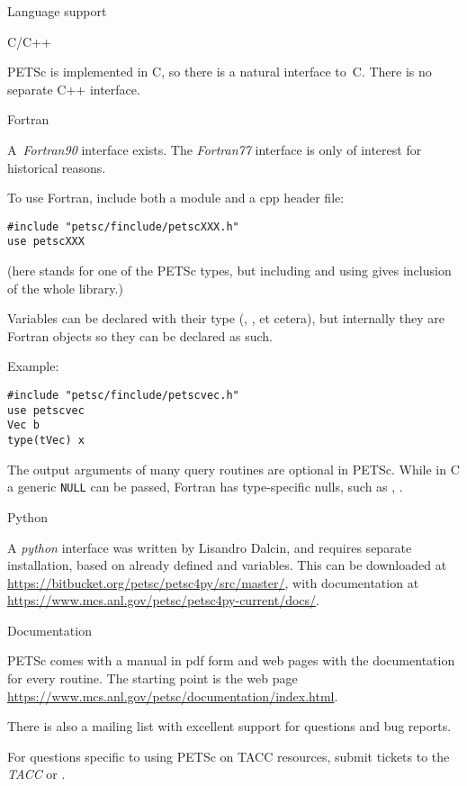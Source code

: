  {Language support}

 {C/C++}

PETSc is implemented in C, so there is a natural interface
to~C. There is no separate C++ interface.

 {Fortran}

A~\emph{Fortran90}
interface exists. The \emph{Fortran77}
interface is only of
interest for historical reasons.

To use Fortran, include both a module and a cpp header file:
\begin{verbatim}
#include "petsc/finclude/petscXXX.h"
use petscXXX
\end{verbatim}
(here  stands for one of the PETSc types, but including
 and using 
gives inclusion of the whole library.)

Variables can be declared with their type (,
,  et cetera), but internally they are
Fortran  objects so they can be declared as such.

Example:
\begin{lstlisting}
#include "petsc/finclude/petscvec.h"
use petscvec
Vec b
type(tVec) x
\end{lstlisting}

The output arguments of many query routines are optional in PETSc.
While in C a generic \lstinline{NULL} can be passed,
Fortran has type-specific nulls, such as
, .

 {Python}

A \emph{python} interface was written by
Lisandro Dalcin, and requires separate installation, based on already
defined  and 
variables.  This can be downloaded at
\url{https://bitbucket.org/petsc/petsc4py/src/master/}, with
documentation at
\url{https://www.mcs.anl.gov/petsc/petsc4py-current/docs/}.

 {Documentation}

PETSc comes with a manual in pdf form and web pages with the
documentation for every routine. The starting point is the web page
\url{https://www.mcs.anl.gov/petsc/documentation/index.html}.

There is also a mailing list with excellent support for questions and
bug reports.
\begin{taccnote}
  For questions specific to using PETSc on TACC resources, submit
  tickets to the \emph{TACC} or
  .
\end{taccnote}

